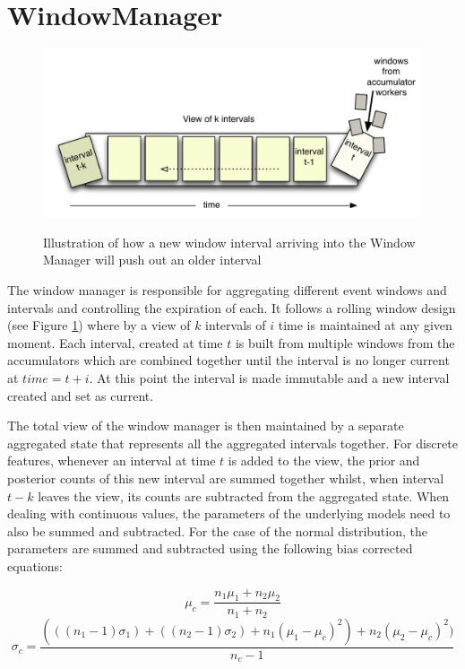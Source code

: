 \documentclass[a4paper,11pt]{scrreprt}
\begin{document}
\section{WindowManager}
\begin{figure}[h!]
\centering
\caption{Illustration of how a new window interval arriving into the Window Manager will push out an older interval}
\includegraphics[scale=0.72, trim=0 0 0 12, clip=true] {window.pdf}
\label{fig:rollingwindow}
\end{figure}
The window manager is responsible for aggregating different event windows and intervals and controlling the expiration of each. It follows a rolling window design (see Figure \ref{fig:rollingwindow}) where by a view of \(k\) intervals of \(i\) time is maintained at any given moment. Each interval, created at time \(t\) is built from multiple windows from the accumulators which are combined together until the interval is no longer current at \(time = t+i\). At this point the interval is made immutable and a new interval created and set as current. 

The total view of the window manager is then maintained by a separate aggregated state that represents all the aggregated intervals together. For discrete features, whenever an interval at time \(t\) is added to the view, the prior and posterior counts of this new interval are summed together whilst, when interval \(t-k\) leaves the view, its counts are subtracted from the aggregated state. When dealing with continuous values, the parameters of the underlying models need to also be summed and subtracted. For the case of the normal distribution, the parameters are summed and subtracted using the following bias corrected equations:
\newpage
\begin{myequations}
\begin{equation}
\mu_c = \frac{n_1\mu_1 + n_2\mu_2}{n_1 + n_2}
\end{equation}
\begin{equation}
\sigma_c = \frac{(((n_1 -1) \sigma_1) + ((n_2-1) \sigma_2) + n_1(\mu_1 - \mu_c)^2) + n_2(\mu_2 - \mu_c)^2)}{n_c-1}
\end{equation}
\label{eq:combiningparamsadd}
\end{myequations}
\end{document}
